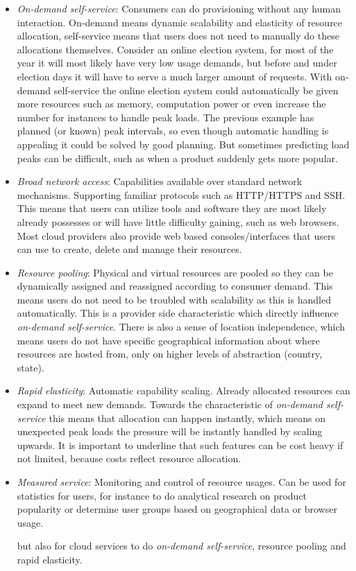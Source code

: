 \begin{itemize}
  \item \emph{On-demand self-service}: 
    Consumers can do provisioning without any human interaction.
    On-demand means dynamic scalability and elasticity of resource allocation,
    self-service means that users does not need to manually do these allocations themselves.
    Consider an online election system, for most of the year it will most likely have very
    low usage demands, but before and under election days it will have to serve
    a much larger amount of requests. With on-demand self-service the online election system
    could automatically be given more resources such as memory, computation power or even
    increase the number for instances to handle peak loads.
    The previous example has planned (or known) peak intervals, so even though automatic handling
    is appealing it could be solved by good planning. 
    But sometimes predicting load peaks can be difficult, such as when a product suddenly
    gets more popular.
  \item \emph{Broad network access}: Capabilities available over standard network mechanisms.
    Supporting familiar protocols such as HTTP/HTTPS and SSH.
    This means that users can utilize tools and software they are most likely already possesses
    or will have little difficulty gaining, such as web browsers.
    Most cloud providers also provide web based consoles/interfaces that users can use
    to create, delete and manage their resources.
  \item \emph{Resource pooling}: Physical and virtual resources are pooled so they can be 
    dynamically assigned and reassigned according to consumer demand.
    This means users do not need to be troubled with scalability as this is handled automatically.
    This is a provider side characteristic which directly influence \emph{on-demand self-service}.
    There is also a sense of location independence, which means users do not have specific geographical
    information about where resources are hosted from, only on higher levels of abstraction (country, state).
  \item \emph{Rapid elasticity}: Automatic capability scaling.
    Already allocated resources can expand to meet new demands.
    Towards the characteristic of \emph{on-demand self-service} this means that allocation
    can happen instantly, which means on unexpected peak loads the pressure will be
    instantly handled by scaling upwards.
    It is important to underline that such features can be cost heavy if not limited,
    because costs reflect resource allocation.
  \item \emph{Measured service}: Monitoring and control of resource usages.
    Can be used for statistics for users, for instance to do analytical research on product popularity
    or determine user groups based on geographical data or browser usage.
    
    but also for cloud services to do
    \emph{on-demand self-service}, resource pooling and rapid elasticity.
\end{itemize}

